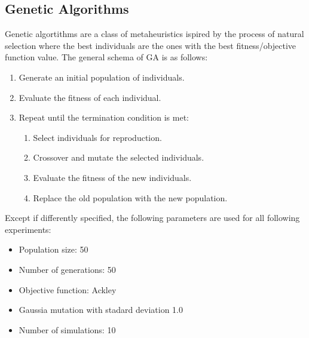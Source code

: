 \subsection{Genetic Algorithms}
Genetic algortithms are a class of metaheuristics ispired by the process of natural selection where the best individuals are the ones with the best fitness/objective function value. The general schema of GA is as follows:
\begin{enumerate}
    \item Generate an initial population of individuals.
    \item Evaluate the fitness of each individual.
    \item Repeat until the termination condition is met:
          \begin{enumerate}
              \item Select individuals for reproduction.
              \item Crossover and mutate the selected individuals.
              \item Evaluate the fitness of the new individuals.
              \item Replace the old population with the new population.
          \end{enumerate}
\end{enumerate}

Except if differently specified, the following parameters are used for all following experiments:
\begin{itemize}
    \item Population size: 50
    \item Number of generations: 50
    \item Objective function: Ackley
    \item Gaussia mutation with stadard deviation 1.0
    \item Number of simulations: 10
\end{itemize}

